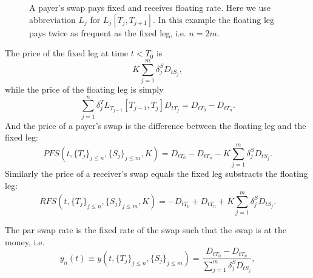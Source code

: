 \begin{figure}
  \caption{A payer's swap pays fixed and receives floating rate. Here we use
           abbreviation $L_j$ for $L_j[T_j,T_{j+1}]$. In this example the
           floating leg pays twice as frequent as the fixed leg, i.e. $n=2m$.}
  \label{F:swap}
\end{figure}

The price of the fixed leg at time $t<T_0$ is
\[
  K \sum_{j=1}^m \delta^S_j D_{tS_j},
\]
while the price of the floating leg is simply
\[
  \sum_{j=1}^n \delta^T_j L_{T_{j-1}}[T_{j-1},T_j] D_{tT_j}
    = D_{tT_0} - D_{tT_n}.
\]
And the price of a payer's swap is the difference between the floating leg and
the fixed leg:
\begin{equation}
  PFS(t,\{T_j\}_{j\le n},\{S_j\}_{j\le m},K)
    = D_{tT_0} - D_{tT_n} - K\sum_{j=1}^m \delta^S_j D_{tS_j}.
\end{equation}
Similarly the price of a receiver's swap equals the fixed leg substracts the
floating leg:
\begin{equation}
  RFS(t,\{T_j\}_{j\le n},\{S_j\}_{j\le m},K)
    = -D_{tT_0} + D_{tT_n} + K\sum_{j=1}^m \delta^S_j D_{tS_j}.
\end{equation}


The par swap rate is the fixed rate of the swap such that the swap is at the 
money, i.e.
\begin{equation} \label{E:swap}
  y_n(t) \equiv y(t,\{T_j\}_{j\le n},\{S_j\}_{j\le m}) 
    = \frac{ D_{tT_0} - D_{tT_n} }{ \sum_{j=1}^m \delta^S_j D_{tS_j} },
\end{equation}



